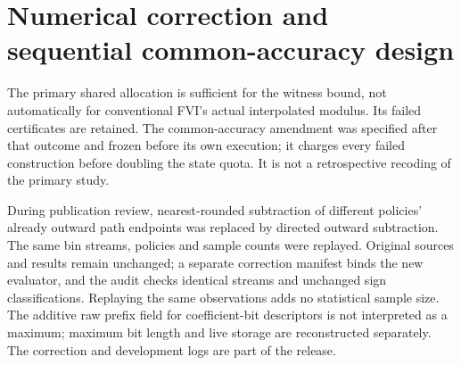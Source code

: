 \documentclass[ecta,nameyear,draft]{econsocart}
\begin{document}
\section{Numerical correction and sequential common-accuracy design}\label{supp:corrections50}
The primary shared allocation is sufficient for the witness bound, not automatically for conventional FVI's actual interpolated modulus. Its failed certificates are retained. The common-accuracy amendment was specified after that outcome and frozen before its own execution; it charges every failed construction before doubling the state quota. It is not a retrospective recoding of the primary study.

During publication review, nearest-rounded subtraction of different policies' already outward path endpoints was replaced by directed outward subtraction. The same bin streams, policies and sample counts were replayed. Original sources and results remain unchanged; a separate correction manifest binds the new evaluator, and the audit checks identical streams and unchanged sign classifications. Replaying the same observations adds no statistical sample size. The additive raw prefix field for coefficient-bit descriptors is not interpreted as a maximum; maximum bit length and live storage are reconstructed separately. The correction and development logs are part of the release.




\end{document}
